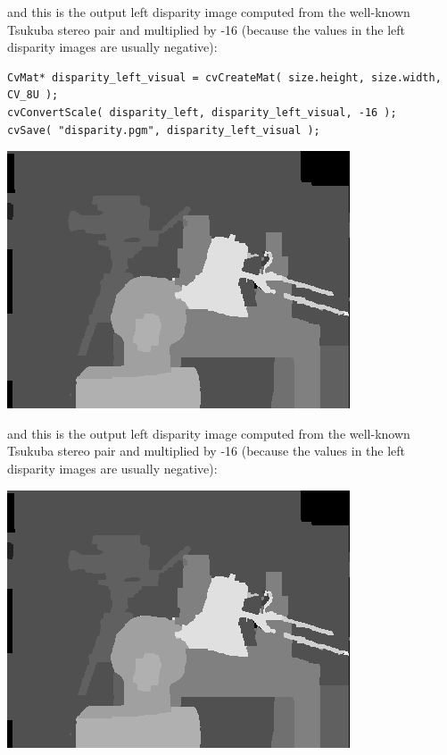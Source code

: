 and this is the output left disparity image computed from the well-known
Tsukuba stereo pair and multiplied by -16 (because the values in the
left disparity images are usually negative):

\begin{lstlisting}
CvMat* disparity_left_visual = cvCreateMat( size.height, size.width, CV_8U );
cvConvertScale( disparity_left, disparity_left_visual, -16 );
cvSave( "disparity.pgm", disparity_left_visual );
\end{lstlisting}

\includegraphics{pics/disparity.png}

\else



and this is the output left disparity image computed from the well-known
Tsukuba stereo pair and multiplied by -16 (because the values in the
left disparity images are usually negative):

\includegraphics{pics/disparity.png}

\fi

